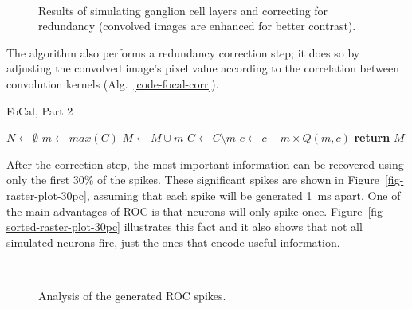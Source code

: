 \begin{figure}[hbt]
  \centering
  \\
  \caption{Results of simulating ganglion cell layers and correcting for redundancy (convolved images are enhanced for better contrast).}
  \label{fig-convolution-results}
\end{figure}
The algorithm also performs a redundancy correction step; it does so by 
adjusting the convolved image's pixel value according to the correlation 
between convolution kernels (Alg.~\ref{code-focal-corr}).
\begin{algorithm}[h]
  \caption{FoCal, Part 2}
  \label{code-focal-corr}
  \begin{algorithmic}
    \State $N \leftarrow \emptyset$ 
    \Repeat
    \State $m \leftarrow max(C)$
    \State $M \leftarrow M \cup m$
    \State $C \leftarrow C \setminus m$
     
     
    \State $c \leftarrow c - m \times Q(m, c)$
    \EndIf
    \EndFor
    \State \textbf{return} $M$
    \EndProcedure
  \end{algorithmic}
\end{algorithm}

After the correction step, the most important information can be recovered using only the first 30\% of the spikes. These significant spikes are shown in Figure~\ref{fig-raster-plot-30pc}, assuming that each spike will be generated 1~ms apart. One of the main advantages of ROC is that neurons will only spike once. Figure~\ref{fig-sorted-raster-plot-30pc} illustrates this fact and it also shows that not all simulated neurons fire, just the ones that encode useful information.
\begin{figure}[hbt]
  \centering
  \\[0.1em]
  \caption{Analysis of the generated ROC spikes.}
  \label{fig-focal-raster-spikes}
\end{figure}

